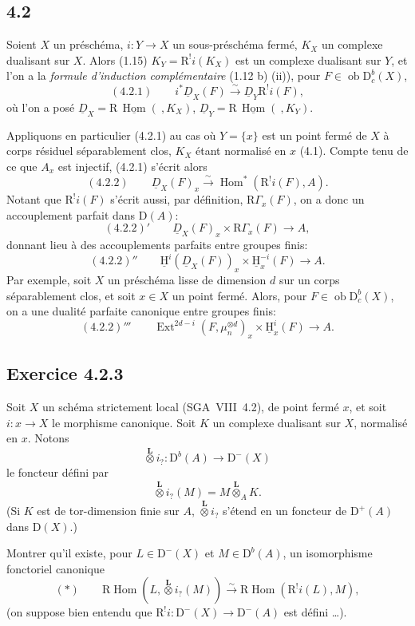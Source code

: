 \documentclass[11pt]{article}
\providecommand{\uH}{\underline{\mathrm H}}
\DeclareMathOperator{\Hom}{Hom}
\DeclareMathOperator{\Ext}{Ext}
\newcommand{\R}{\mathrm{R}}
\newcommand{\D}{\mathrm{D}}
\newcommand{\ob}{\operatorname{ob}}
\providecommand{\Hom}{\operatorname{Hom}}
\providecommand{\ob}{\operatorname{ob}}
\providecommand{\R}{\mathrm R}
\begin{document}
\subsection*{4.2}
Soient $X$ un préschéma, $i:Y\to X$ un sous-préschéma fermé, $K_X$ un complexe dualisant sur $X$. Alors (1.15) $K_Y=\R^{!}i(K_X)$ est un complexe dualisant sur $Y$, et l'on a la \emph{formule d'induction complémentaire} (1.12 b) (ii)), pour $F\in \ob\D_c^b(X)$,
\[
(4.2.1)\qquad i^*\underline{D}_X(F)\xrightarrow{\sim}\underline{D}_Y\R^{!}i(F),
\]
où l'on a posé $\underline{D}_X=\R\,\underline{\Hom}(\ ,K_X)$, $\underline{D}_Y=\R\,\underline{\Hom}(\ ,K_Y)$.

Appliquons en particulier (4.2.1) au cas où $Y=\{x\}$ est un point fermé de $X$ à corps résiduel séparablement clos, $K_X$ étant normalisé en $x$ (4.1). Compte tenu de ce que $A_x$ est injectif, (4.2.1) s'écrit alors
\[
(4.2.2)\qquad \underline{D}_X(F)_x\xrightarrow{\sim}\Hom^*(\R^{!}i(F),A).
\]
Notant que $\R^{!}i(F)$ s'écrit aussi, par définition, $\R\Gamma_x(F)$, on a donc un accouplement parfait dans $\D(A)$:
\[
(4.2.2)'\qquad \underline{D}_X(F)_x\times \R\Gamma_x(F)\longrightarrow A,
\]
donnant lieu à des accouplements parfaits entre groupes finis:
\[
(4.2.2)''\qquad \uH^i(\underline{D}_X(F))_x\times \uH_x^{-i}(F)\longrightarrow A.
\]
Par exemple, soit $X$ un préschéma lisse de dimension $d$ sur un corps séparablement clos, et soit $x\in X$ un point fermé. Alors, pour $F\in\ob\D_c^b(X)$, on a une dualité parfaite canonique entre groupes finis:
\[
(4.2.2)'''\qquad \Ext^{2d-i}(F,\mu_n^{\otimes d})_x\times \uH_x^i(F)\longrightarrow A.
\]

\subsection*{Exercice 4.2.3}
Soit $X$ un schéma strictement local (SGA~VIII~4.2), de point fermé $x$, et soit $i:x\to X$ le morphisme canonique. Soit $K$ un complexe dualisant sur $X$, normalisé en $x$. Notons
\[
\overset{\mathbf L}{\otimes} i_? : \D^b(A)\longrightarrow \D^-(X)
\]
le foncteur défini par
\[
\overset{\mathbf L}{\otimes} i_?(M)=M\overset{\mathbf L}{\otimes}_A K.
\]
(Si $K$ est de tor-dimension finie sur $A$, $\overset{\mathbf L}{\otimes} i_?$ s'étend en un foncteur de $\D^+(A)$ dans $\D(X)$.)

Montrer qu'il existe, pour $L\in\D^-(X)$ et $M\in\D^b(A)$, un isomorphisme fonctoriel canonique
\[
(*)\qquad \R\Hom(L,\overset{\mathbf L}{\otimes} i_?(M))\xrightarrow{\sim}\R\Hom(\R^{!}i(L),M),
\]
(on suppose bien entendu que $\R^{!}i:\D^-(X)\to\D^-(A)$ est défini \dots).
\end{document}
